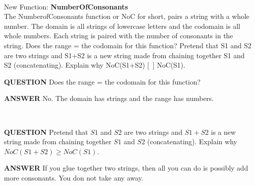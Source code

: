 \documentclass{ximera}
\begin{document}
\begin{exploration}
\quad \\
New Function: \textbf{NumberOfConsonants}\\
The NumberofConsonants function or NoC for short, pairs a string with a whole number. The domain is all strings of lowercase letters and the codomain is all whole numbers. Each string is paired with the number of consonants in the string.
Does the range = the codomain for this function?
Pretend that S1 and S2 are two strings and S1+S2 is a new string made from chaining together S1 and S2 (concatenating).  Explain why NoC(S1+S2) [~] NoC(S1).
\quad \\

\begin{dialogue}
\item[\textbf{QUESTION}] Does the range = the codomain for this function?
\item[\textbf{ANSWER}] No. The domain has strings and the range has numbers.
\end{dialogue}

\quad \\


\begin{dialogue}
\item[\textbf{QUESTION}] Pretend that $S1$ and $S2$ are two strings and $S1+S2$ is a new string made from chaining together $S1$ and $S2$ (concatenating).  Explain why $NoC(S1+S2) \geq NoC(S1)$.
\item[\textbf{ANSWER}] If you glue together two strings, then all you can do is possibly add more consonants. You don not take any away.
\end{dialogue}

\end{exploration}
\quad \\
\end{document}
